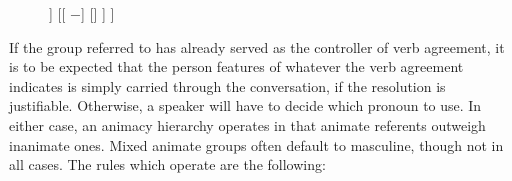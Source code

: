 \begin{figure}
\ex\label{ex:gramgend2}
\begin{forest}
[{[\Gend{}]}
	[{[\Anim{} $+$]}
		[\M]
		[\F]
		[\N]
	]
	[{[\Anim{} $-$]}
		[\Inan]
	]
]
\end{forest}
\xe
\end{figure}

If the group referred to has already served as the controller of verb
agreement, it is to be expected that the person features of whatever the verb
agreement indicates is simply carried through the conversation, if the
resolution is justifiable. Otherwise, a speaker will have to decide which
pronoun to use. In either case, an animacy hierarchy operates in that animate
referents outweigh inanimate ones. Mixed animate groups often default to
masculine, though not in all cases. The rules which operate are the following:

